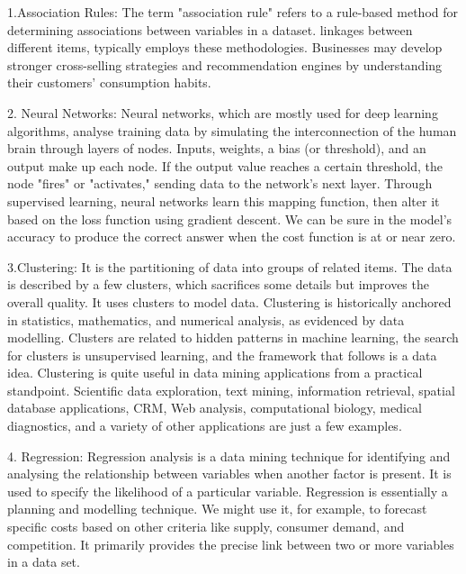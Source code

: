 \documentclass[12pt,letterpaper]{article}
\begin{document}
1.Association Rules: The term "association rule" refers to a rule-based method for determining associations between variables in a dataset.  linkages between different items, typically employs these methodologies. Businesses may develop stronger cross-selling strategies and recommendation engines by understanding their customers' consumption habits.

2. Neural Networks: Neural networks, which are mostly used for deep learning algorithms, analyse training data by simulating the interconnection of the human brain through layers of nodes. Inputs, weights, a bias (or threshold), and an output make up each node. If the output value reaches a certain threshold, the node "fires" or "activates," sending data to the network's next layer. Through supervised learning, neural networks learn this mapping function, then alter it based on the loss function using gradient descent. We can be sure in the model's accuracy to produce the correct answer when the cost function is at or near zero.

3.Clustering: It is the partitioning of data into groups of related items. The data is described by a few clusters, which sacrifices some details but improves the overall quality. It uses clusters to model data. Clustering is historically anchored in statistics, mathematics, and numerical analysis, as evidenced by data modelling. Clusters are related to hidden patterns in machine learning, the search for clusters is unsupervised learning, and the framework that follows is a data idea. Clustering is quite useful in data mining applications from a practical standpoint. Scientific data exploration, text mining, information retrieval, spatial database applications, CRM, Web analysis, computational biology, medical diagnostics, and a variety of other applications are just a few examples.

4. Regression: Regression analysis is a data mining technique for identifying and analysing the relationship between variables when another factor is present. It is used to specify the likelihood of a particular variable. Regression is essentially a planning and modelling technique. We might use it, for example, to forecast specific costs based on other criteria like supply, consumer demand, and competition. It primarily provides the precise link between two or more variables in a data set.
\end{document}
